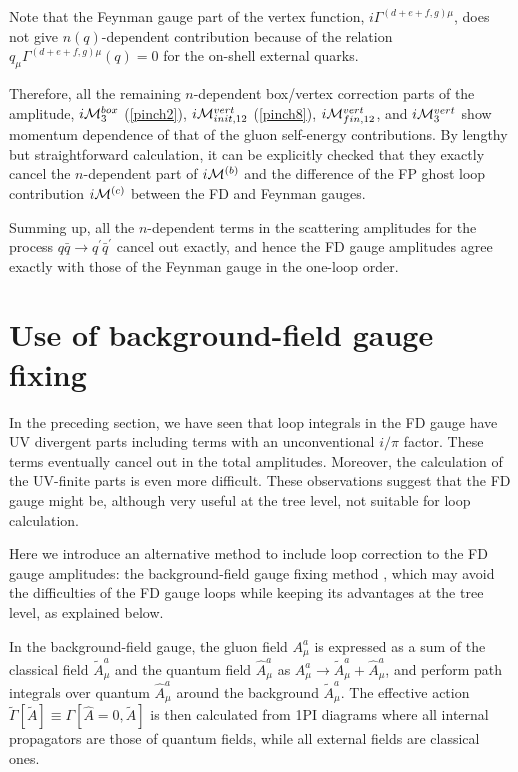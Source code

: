 \documentclass[preprint,amsmath,amssymb,superscriptaddress, floatfix,nofootinbib]{revtex4}
\begin{document}
Note that the Feynman gauge part of the vertex function, 
$i\Gamma^{(d+e+f, g)\mu}$, does not give $n(q)$-dependent contribution 
because of the relation 
$q_{\mu}\Gamma^{(d+e+f, g)\mu}(q)=0$ for the on-shell external quarks. 

Therefore, all the remaining $n$-dependent box/vertex correction 
parts of the amplitude, $i{\cal M}^{box}_3$ (\ref{pinch2}), 
$i{\cal M}^{vert}_{init,12}$ (\ref{pinch8}), $i{\cal M}^{vert}_{fin,12}$, 
and $i{\cal M}^{vert}_3$ show momentum dependence of 
that of the gluon self-energy contributions. 
By lengthy but straightforward calculation, 
it can be explicitly checked 
that they exactly cancel the $n$-dependent part of $i{\cal M}^{(b)}$ 
and the difference of the FP ghost loop contribution $i{\cal M}^{(c)}$ 
between the FD and Feynman gauges. 

Summing up, all the $n$-dependent terms in the scattering amplitudes for the process 
$q\bar{q}\to q^\prime\bar{q}^\prime$ cancel out exactly, and hence the FD gauge amplitudes 
agree exactly with those of the Feynman gauge in the one-loop order. 
\section{Use of background-field gauge fixing}
\label{sec:bkg}

In the preceding section, we have seen that loop integrals in the FD gauge have 
UV divergent parts including terms with an unconventional $i/\pi$ factor. 
These terms 
eventually cancel out in the total amplitudes. 
Moreover, the calculation of the UV-finite parts is even more difficult. 
These observations 
suggest that the FD gauge might be, although very useful at the tree level,
not suitable for loop calculation. 

Here we introduce an alternative method to include loop correction to the 
FD gauge amplitudes: the background-field gauge fixing 
method \cite{Kluberg-Stern:1974nmx,Kluberg-Stern:1975ebk,Abbott:1980hw,
Abbott:1981ke}, 
which may avoid the difficulties of the FD gauge loops while keeping its advantages 
at the tree level, as explained below. 

In the background-field gauge, 
the gluon field $A^a_{\mu}$ is expressed as a sum of the 
classical field $\tilde{A}^a_{\mu}$ and 
the quantum field $\hat{A}^a_{\mu}$ as 
$A^a_{\mu}\to\tilde{A}^a_{\mu}+\hat{A}^a_{\mu}$, and perform path integrals over 
quantum $\hat{A}^a_{\mu}$ around the background $\tilde{A}^a_{\mu}$. 
The effective action $\tilde{\Gamma}[\tilde{A}]\equiv\Gamma[\hat{A}=0, \tilde{A}]$ 
is then calculated from 1PI diagrams 
where all internal propagators are those of quantum fields, 
while all external fields are classical ones. 
\end{document}
